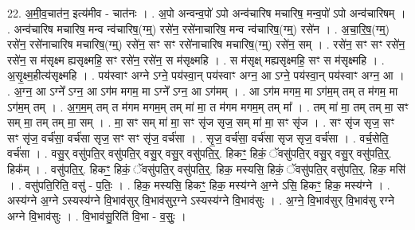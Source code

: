 \documentclass[17pt]{extarticle}
\begin{document}
22. अ॒मी॒व॒चात॑न॒ इत्य॑मीव - चात॑नः । . अ॒पो अन्वन्व॒पो॑ ऽपो अन्व॑चारिष मचारिष॒ मन्व॒पो॑ ऽपो अन्व॑चारिषम् । . अन्व॑चारिष मचारिष॒ मन्व न्व॑चारिष॒(ग्म्॒) रसे॑न॒ रसे॑नाचारिष॒ मन्व न्व॑चारिष॒(ग्म्॒) रसे॑न । . अ॒चा॒रि॒ष॒(ग्म्॒) रसे॑न॒ रसे॑नाचारिष मचारिष॒(ग्म्॒) रसे॑न॒ सꣳ सꣳ रसे॑नाचारिष मचारिष॒(ग्म्॒) रसे॑न॒ सम् । . रसे॑न॒ सꣳ सꣳ रसे॑न॒ रसे॑न॒ स म॑सृक्ष्म ह्यसृक्ष्महि॒ सꣳ रसे॑न॒ रसे॑न॒ स म॑सृक्ष्महि । . स म॑सृक्ष् मह्यसृक्ष्महि॒ सꣳ स म॑सृक्ष्महि । . अ॒सृ॒क्ष्म॒हीत्य॑सृक्ष्महि । . पय॑स्वाꣳ अग्ने ऽग्ने॒ पय॑स्वा॒न् पय॑स्वाꣳ अग्न॒ आ ऽग्ने॒ पय॑स्वा॒न् पय॑स्वाꣳ अग्न॒ आ । . अ॒ग्न॒ आ ऽग्ने᳚ ऽग्न॒ आ ऽग॑म मगम॒ मा ऽग्ने᳚ ऽग्न॒ आ ऽग॑मम् । . आ ऽग॑म मगम॒ मा ऽग॑म॒म् तम् त म॑गम॒ मा ऽग॑म॒म् तम् । . अ॒ग॒म॒म् तम् त म॑गम मगम॒म् तम् मा॑ मा॒ त म॑गम मगम॒म् तम् मा᳚ । . तम् मा॑ मा॒ तम् तम् मा॒ सꣳ सम् मा॒ तम् तम् मा॒ सम् । . मा॒ सꣳ सम् मा॑ मा॒ सꣳ सृ॑ज सृज॒ सम् मा॑ मा॒ सꣳ सृ॑ज । . सꣳ सृ॑ज सृज॒ सꣳ सꣳ सृ॑ज॒ वर्च॑सा॒ वर्च॑सा सृज॒ सꣳ सꣳ सृ॑ज॒ वर्च॑सा । . सृ॒ज॒ वर्च॑सा॒ वर्च॑सा सृज सृज॒ वर्च॑सा । . वर्च॒सेति॒ वर्च॑सा । . वसु॒र् वसु॑पति॒र् वसु॑पति॒र् वसु॒र् वसु॒र् वसु॑पति॒र्॒. हिकꣳ॒॒ हिकं॒ ॅवसु॑पति॒र् वसु॒र् वसु॒र् वसु॑पति॒र्॒. हिक᳚म् । . वसु॑पति॒र्॒. हिकꣳ॒॒ हिकं॒ ॅवसु॑पति॒र् वसु॑पति॒र्॒. हिक॒ मस्यसि॒ हिकं॒ ॅवसु॑पति॒र् वसु॑पति॒र्॒. हिक॒ मसि॑ । . वसु॑पति॒रिति॒ वसु॑ - प॒तिः॒ । . हिक॒ मस्यसि॒ हिकꣳ॒॒ हिक॒ मस्य॑ग्ने अ॒ग्ने ऽसि॒ हिकꣳ॒॒ हिक॒ मस्य॑ग्ने । . अस्य॑ग्ने अ॒ग्ने ऽस्यस्य॑ग्ने वि॒भाव॑सुर् वि॒भाव॑सुर॒ग्ने ऽस्यस्य॑ग्ने वि॒भाव॑सुः । . अ॒ग्ने॒ वि॒भाव॑सुर् वि॒भाव॑सु रग्ने अग्ने वि॒भाव॑सुः । . वि॒भाव॑सु॒रिति॑ वि॒भा - व॒सुः॒ । \newline
\end{document}
